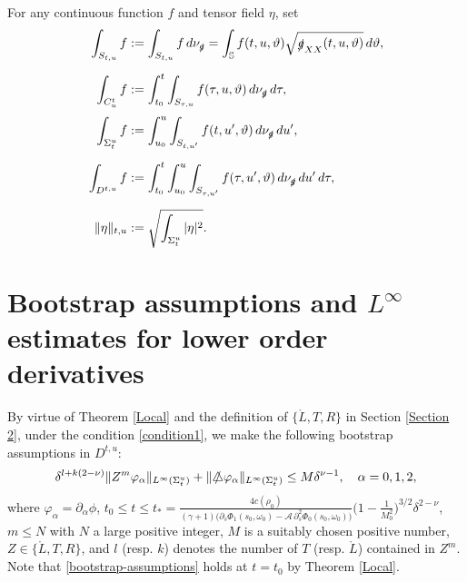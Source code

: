 \documentclass[11pt,twoside]{article}
\def\al{\alpha}
\def\vp{\varphi}
\begin{document}
\begin{definition}\label{3.4}
 For any continuous function $f$ and tensor field $\eta$, set
 \begin{align*}
 \int_{S_{t, u}} f &:= \int_{S_{t, u}} f \, d\nu_{\slashed{g}}
 = \int_{\mathbb{S}} f(t, u, \vartheta) \sqrt{\slashed{g}_{XX}(t, u, \vartheta)} \, d\vartheta, \\[6pt]
 \int_{C^t_u} f &:= \int_{t_0}^t \int_{S_{\tau, u}} f(\tau, u, \vartheta) \, d\nu_{\slashed{g}} \, d\tau, \\[3pt]
 \int_{\Sigma_t^u} f &:= \int_{u_0}^u \int_{S_{t, u'}} f(t, u', \vartheta) \, d\nu_{\slashed{g}} \, du', \\[6pt]
 \int_{D^{t, u}} f &:= \int_{t_0}^t \int_{u_0}^u \int_{S_{\tau, u'}} f(\tau, u', \vartheta) \, d\nu_{\slashed{g}} \, du' \, d\tau, \\[6pt]
 \|\eta\|_{t,u} &:= \sqrt{\int_{\Sigma_t^u} |\eta|^2}.
 \end{align*}
\end{definition}

\section{Bootstrap assumptions and $L^{\infty}$ estimates for lower order derivatives}\label{Section 3}

By virtue of Theorem \ref{Local} and the definition of $\{\mathring{L}, T, R\}$ in Section \ref{Section 2}, under the condition
\eqref{condition1}, we make the following bootstrap assumptions in $D^{t,u}$:
\begin{equation}\label{bootstrap-assumptions}
\delta^{l+k(2-\nu)} \| Z^{m}\vp_{\al} \|_{L^{\infty}(\Sigma_t^u)}+\|\slashed\triangle\vp_{\al}\|_{L^{\infty}(\Sigma_t^u)} \leq M \delta^{\nu-1},
\quad \al= 0, 1, 2,
\end{equation}
where $\vp_{\al} = \partial_{\al} \phi$, $t_0\leq t \leq t_*=
 \frac{4c(\rho_0)}{(\gamma+1)\big(\partial_s\Phi_1(s_0,\omega_0)-\mathcal A\,\partial_s^2\Phi_0(s_0,\omega_0)\big)}\big(1-\frac{1}{M_0^2}\big)^{3/2}\delta^{2-\nu}$,
$m \leq N$ with $N$ a large positive integer, $M$ is a suitably chosen positive number,
$Z \in \{\mathring{L}, T, R\}$, and $l$ (resp. $k$) denotes the number of $T$ (resp. $\mathring{L}$)
contained in $Z^{m}$.
Note that \eqref{bootstrap-assumptions} holds at $t=t_0$ by Theorem \ref{Local}.
\end{document}
